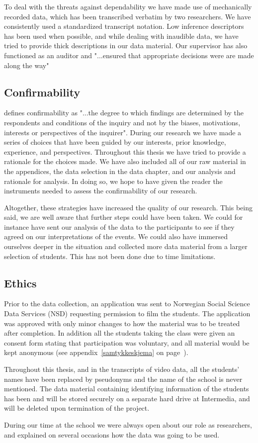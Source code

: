 To deal with the threats against dependability we have made use of mechanically recorded data, which has been transcribed verbatim by two researchers. We have consistently used a standardized transcript notation. Low inference descriptors has been used when possible, and while dealing with inaudible data, we have tried to provide thick descriptions in our data material. Our supervisor has also functioned as an auditor and "...ensured that appropriate decisions were are made along the way" \citep{baxter1997evaluating}

\subsection{Confirmability}
\citet{lincoln1985naturalistic} defines confirmability as "...the degree to which findings are determined by the respondents and conditions of the inquiry and not by the biases, motivations, interests or perspectives of the inquirer". During our research we have made a series of choices that have been guided by our interests, prior knowledge, experience, and perspectives. Throughout this thesis we have tried to provide a rationale for the choices made. We have also included all of our raw material in the appendices, the data selection in the data chapter, and our analysis and rationale for analysis. In doing so, we hope to have given the reader the instruments needed to assess the confirmability of our research.  

Altogether, these strategies have increased the quality of our research. This being said, we are well aware that further steps could have been taken. We could for instance have sent our analysis of the data to the participants to see if they agreed on our interpretations of the events. We could also have immersed ourselves deeper in the situation and collected more data material from a larger selection of students. This has not been done due to time limitations. 

\subsection{Ethics}
Prior to the data collection, an application was sent to Norwegian Social Science Data Services (NSD) requesting permission to film the students. The application was approved with only minor changes to how the material was to be treated after completion. In addition all the students taking the class were given an consent form stating that participation was voluntary, and all material would be kept anonymous (see appendix~\ref{samtykkeskjema} on page~\pageref{samtykkeskjema}). 

Throughout this thesis, and in the transcripts of video data, all the students' names have been replaced by pseudonyms and the name of the school is never mentioned. The data material containing identifying information of the students has been and will be stored securely on a separate hard drive at Intermedia, and will be deleted  upon termination of the project. 

During our time at the school we were always open about our role as researchers, and explained on several occasions how the data was going to be used. 

